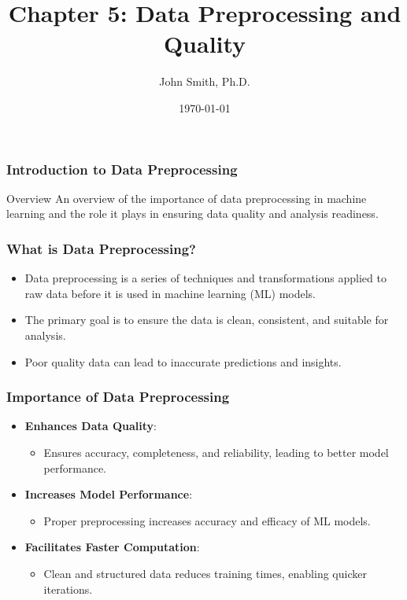 \documentclass[aspectratio=169]{beamer}
\title[Data Preprocessing and Quality]{Chapter 5: Data Preprocessing and Quality}
\author[J. Smith]{John Smith, Ph.D.}
\institute[University Name]{Department of Computer Science\\ University Name}
\date{\today}
\begin{document}
\frame{\titlepage}

\begin{frame}[fragile]
    \frametitle{Introduction to Data Preprocessing}
    \begin{block}{Overview}
        An overview of the importance of data preprocessing in machine learning 
        and the role it plays in ensuring data quality and analysis readiness.
    \end{block}
\end{frame}

\begin{frame}[fragile]
    \frametitle{What is Data Preprocessing?}
    \begin{itemize}
        \item Data preprocessing is a series of techniques and transformations applied to raw data before it is used in machine learning (ML) models.
        \item The primary goal is to ensure the data is clean, consistent, and suitable for analysis.
        \item Poor quality data can lead to inaccurate predictions and insights.
    \end{itemize}
\end{frame}

\begin{frame}[fragile]
    \frametitle{Importance of Data Preprocessing}
    \begin{itemize}
        \item \textbf{Enhances Data Quality}:
            \begin{itemize}
                \item Ensures accuracy, completeness, and reliability, leading to better model performance.
            \end{itemize}
        \item \textbf{Increases Model Performance}:
            \begin{itemize}
                \item Proper preprocessing increases accuracy and efficacy of ML models.
            \end{itemize}
        \item \textbf{Facilitates Faster Computation}:
            \begin{itemize}
                \item Clean and structured data reduces training times, enabling quicker iterations.
            \end{itemize}
    \end{itemize}
\end{frame}
\end{document}
